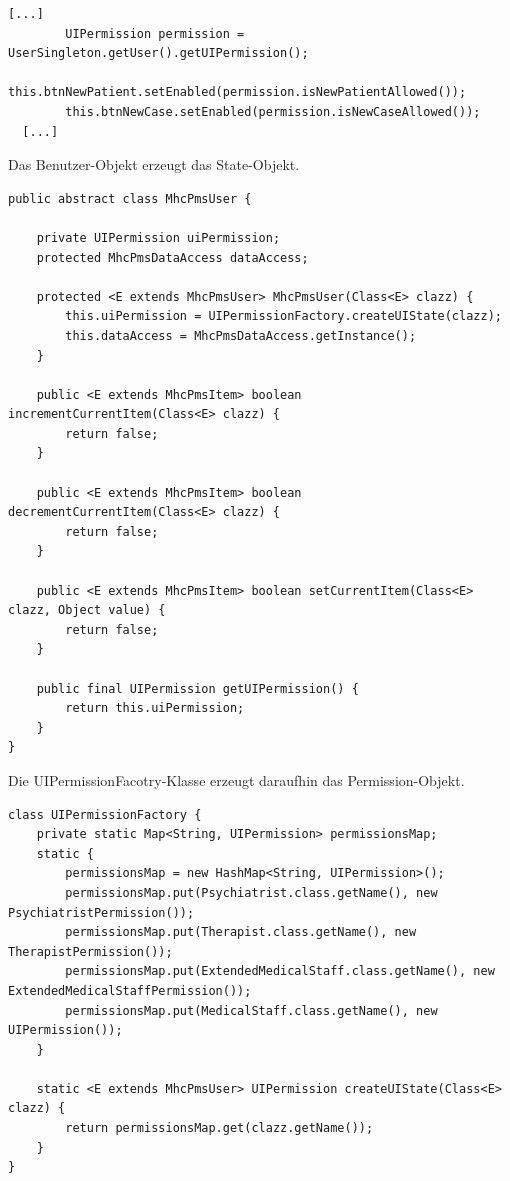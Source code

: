 \documentclass[10pt,a4paper]{article}
\begin{document}
%
\begin{lstlisting}[caption={UI-Klasse}]
  [...]
		UIPermission permission = UserSingleton.getUser().getUIPermission();
		this.btnNewPatient.setEnabled(permission.isNewPatientAllowed());
		this.btnNewCase.setEnabled(permission.isNewCaseAllowed());
  [...]
\end{lstlisting}
%
Das Benutzer-Objekt erzeugt das State-Objekt.
%
\begin{lstlisting}[caption={Benutzer-Klasse}]
public abstract class MhcPmsUser {

	private UIPermission uiPermission;	
	protected MhcPmsDataAccess dataAccess;
	
	protected <E extends MhcPmsUser> MhcPmsUser(Class<E> clazz) {
		this.uiPermission = UIPermissionFactory.createUIState(clazz);
		this.dataAccess = MhcPmsDataAccess.getInstance();
	}
	
	public <E extends MhcPmsItem> boolean incrementCurrentItem(Class<E> clazz) {
		return false;
	}

	public <E extends MhcPmsItem> boolean decrementCurrentItem(Class<E> clazz) {
		return false;
	}

	public <E extends MhcPmsItem> boolean setCurrentItem(Class<E> clazz, Object value) {
		return false;
	}

	public final UIPermission getUIPermission() {
		return this.uiPermission;
	}
}
\end{lstlisting}
%
Die UIPermissionFacotry-Klasse erzeugt daraufhin das Permission-Objekt.
%
\begin{lstlisting}[caption={UIPermissionFacotry-Klasse}]
class UIPermissionFactory {
	private static Map<String, UIPermission> permissionsMap;
	static {
		permissionsMap = new HashMap<String, UIPermission>();
		permissionsMap.put(Psychiatrist.class.getName(), new PsychiatristPermission());
		permissionsMap.put(Therapist.class.getName(), new TherapistPermission());
		permissionsMap.put(ExtendedMedicalStaff.class.getName(), new ExtendedMedicalStaffPermission());
		permissionsMap.put(MedicalStaff.class.getName(), new UIPermission());
	}

	static <E extends MhcPmsUser> UIPermission createUIState(Class<E> clazz) {
		return permissionsMap.get(clazz.getName());
	}
}
\end{lstlisting}
%
\end{document}
